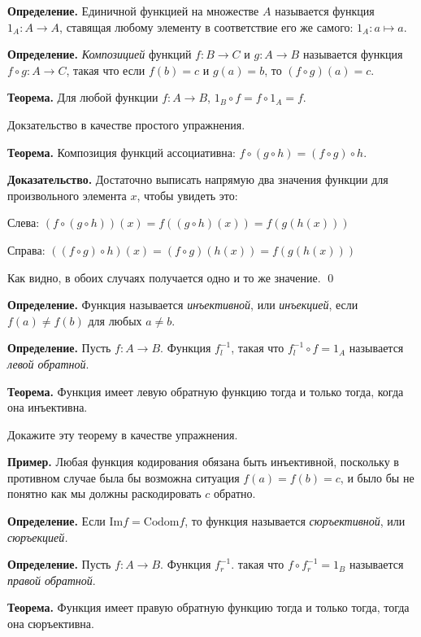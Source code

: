 {\bfseries Определение.} Единичной функцией на множестве $A$ называется функция $1_A: A\to A$, ставящая любому элементу в соответствие его же самого: $1_A: a\mapsto a$.

{\bfseries Определение.} {\slshape Композицией} функций $f:B\to C$ и $g:A\to B$ называется функция $f\circ g: A\to C$, такая что если $f(b) = c$ и $g(a) = b$, то $(f\circ g)(a) = c$.

{\bfseries Теорема.} Для любой функции $f: A\to B$, $1_B \circ f = f \circ 1_A = f$.

Докзательство в качестве простого упражнения.

{\bfseries Теорема.} Композиция функций ассоциативна: $f\circ (g \circ h) = (f\circ g)\circ h$.

{\bfseries Доказательство.} Достаточно выписать напрямую два значения функции для произвольного элемента $x$, чтобы увидеть это:

Слева: $(f\circ (g \circ h)) (x) = f((g\circ h)(x)) = f(g(h(x)))$

Справа: $((f\circ g) \circ h) (x) = (f\circ g)(h(x)) = f(g(h(x)))$

Как видно, в обоих случаях получается одно и то же значение. \qed

{\bfseries Определение.} Функция называется {\slshape инъективной}, или {\slshape инъекцией}, если $f(a)\not= f(b)$ для любых $a\not= b$.

{\bfseries Определение.} Пусть $f:A\to B$. Функция $f^{-1}_l$, такая что $f^{-1}_l\circ f = 1_A$ называется {\slshape левой обратной}.

{\bfseries Теорема.} Функция имеет левую обратную функцию тогда и только тогда, когда она инъективна.

Докажите эту теорему в качестве упражнения.

{\bfseries Пример.} Любая функция кодирования обязана быть инъективной, поскольку в противном случае была бы возможна ситуация $f(a) = f(b) = c$, и было бы не понятно как мы должны раскодировать $c$ обратно.

{\bfseries Определение.} Если $\mathrm{Im}f = \mathrm{Codom}f$, то функция называется {\slshape сюръективной}, или {\slshape сюръекцией.}

{\bfseries Определение.} Пусть $f: A\to B$. Функция $f^{-1}_r$. такая что $f\circ f^{-1}_r = 1_B$ называется {\slshape правой обратной}.

{\bfseries Теорема.} Функция имеет правую обратную функцию тогда и только тогда, тогда она сюръективна.

